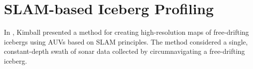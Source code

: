 %
%
%
%
%

\section{SLAM-based Iceberg Profiling}

In \cite{Kimball2011b}, Kimball presented a method for creating high-resolution maps of free-drifting icebergs using AUVs based on SLAM principles. The method considered a single, constant-depth swath of sonar data collected by circumnavigating a free-drifting iceberg. 

